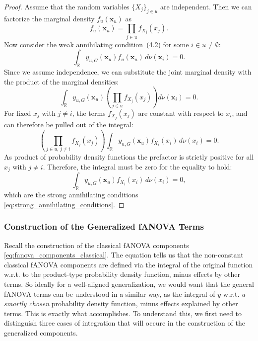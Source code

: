 \begin{proof}
Assume that the random variables $\{X_j\}_{j \in u}$ are independent. Then we can factorize the marginal density $f_u(\boldsymbol{x}_u)$ as
\[
f_u(\boldsymbol{x}_u) = \prod_{j \in u} f_{X_j}(x_j).
\]
Now consider the weak annihilating condition~(4.2) for some $i \in u \neq \emptyset$:
\[
\int_{\mathbb{R}} y_{u,G}(\boldsymbol{x}_u) f_u(\boldsymbol{x}_u) \, d \nu(\boldsymbol{x}_i) = 0.
\]
Since we assume independence, we can substitute the joint marginal density with the product of the marginal densities:
\[
\int_{\mathbb{R}} y_{u,G}(\boldsymbol{x}_u) \left( \prod_{j \in u} f_{X_j}(x_j) \right) d \nu(\boldsymbol{x}_i) = 0.
\]
For fixed $x_j$ with $j \ne i$, the terms $f_{X_j}(x_j)$ are constant with respect to $x_i$, and can therefore be pulled out of the integral:
\[
\left( \prod_{j \in u,\, j \ne i} f_{X_j}(x_j) \right) \int_{\mathbb{R}} y_{u,G}(\boldsymbol{x}_u) f_{X_i}(x_i) \, d \nu(x_i) = 0.
\]
As product of probability density functions the prefactor is strictly positive for all $x_j$ with $j \ne i$. Therefore, the integral must be zero for the equality to hold:
\[
\int_{\mathbb{R}} y_{u,G}(\boldsymbol{x}_u) f_{X_i}(x_i) \, d \nu(x_i) = 0,
\]
which are the strong annihilating conditions \autoref{eq:strong_annihilating_conditions}.
\end{proof}


\subsubsection{Construction of the Generalized fANOVA Terms}
Recall the construction of the classical fANOVA components \autoref{eq:fanova_components_classical}. The equation tells us that the non-constant classical fANOVA components are defined via the integral of the original function w.r.t. to the product-type probability density function, minus effects by other terms. So ideally for a well-aligned generalization, we would want that the general fANOVA terms can be understood in a similar way, as the integral of $y$ w.r.t. \textit{a smartly chosen} probability density function, minus effects explained by other terms.
This is exactly what \cite{rahman2014} accomplishes.
To understand this, we first need to distinguish three cases of integration that will occure in the construction of the generalized components.


